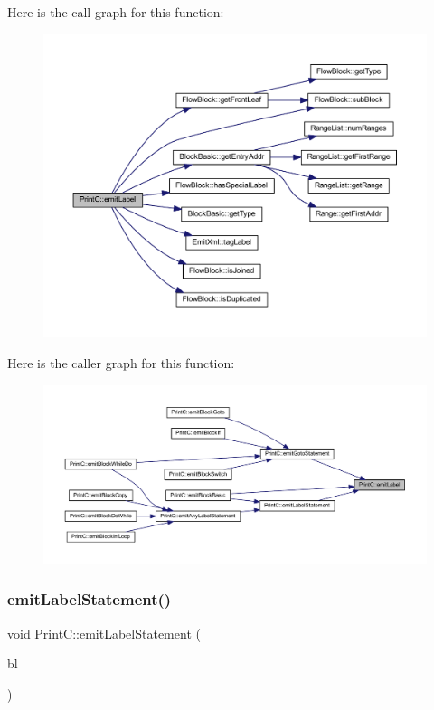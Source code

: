Here is the call graph for this function\+:
\nopagebreak
\begin{figure}[H]
\begin{center}
\leavevmode
\includegraphics[width=350pt]{class_print_c_ac8dc5f836c6c487956b03a55a9d8241f_cgraph}
\end{center}
\end{figure}
Here is the caller graph for this function\+:
\nopagebreak
\begin{figure}[H]
\begin{center}
\leavevmode
\includegraphics[width=350pt]{class_print_c_ac8dc5f836c6c487956b03a55a9d8241f_icgraph}
\end{center}
\end{figure}
\mbox{\label{class_print_c_ad237ae57af8296e4575fd083972c5b21}} 
\subsubsection{\texorpdfstring{emitLabelStatement()}{emitLabelStatement()}}
{\footnotesize\ttfamily void Print\+C\+::emit\+Label\+Statement (\begin{DoxyParamCaption}\item[{const \mbox{\hyperlink{class_flow_block}{Flow\+Block}} $\ast$}]{bl }\end{DoxyParamCaption})\hspace{0.3cm}{\ttfamily [protected]}}



